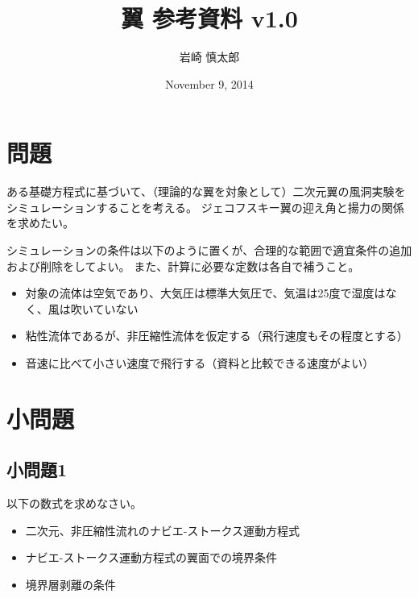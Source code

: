 \documentclass{article}
\title{ 翼 参考資料 v1.0 }
\author{ 岩崎 慎太郎 }
\begin{document}
\date{November 9, 2014}
\maketitle

\section{ 問題 }

ある基礎方程式に基づいて、（理論的な翼を対象として）二次元翼の風洞実験をシミュレーションすることを考える。
ジェコフスキー翼の迎え角と揚力の関係を求めたい。

シミュレーションの条件は以下のように置くが、合理的な範囲で適宜条件の追加および削除をしてよい。
また、計算に必要な定数は各自で補うこと。

\begin{itemize}
\item 対象の流体は空気であり、大気圧は標準大気圧で、気温は25度で湿度はなく、風は吹いていない
\item 粘性流体であるが、非圧縮性流体を仮定する（飛行速度もその程度とする）
\item 音速に比べて小さい速度で飛行する（資料と比較できる速度がよい）
\end{itemize}


\section{ 小問題 }

\subsection{ 小問題1 }

以下の数式を求めなさい。
\begin{itemize}
\item 二次元、非圧縮性流れのナビエ-ストークス運動方程式
\item ナビエ-ストークス運動方程式の翼面での境界条件
\item 境界層剥離の条件
\end{itemize}
\end{document}

